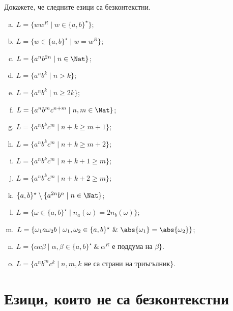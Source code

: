 \begin{problem}
  Докажете, че следните езици са безконтекстни.
  \begin{enumerate}[a)]
  \item
    $L = \{ww^R \mid w \in \{a,b\}^\star\}$;
  \item
    $L = \{w \in \{a,b\}^\star \mid w = w^R\}$;
  \item
    $L = \{a^nb^{2n} \mid n \in \Nat\}$;
  \item
    $L = \{a^nb^k \mid n > k\}$;
  \item
    $L = \{a^nb^k \mid n \geq 2k\}$;
  \item
    $L = \{a^nb^mc^{n+m}\mid n,m \in \Nat\}$;
  \item
    $L = \{a^nb^kc^m \mid n + k \geq m+1\}$;
  \item
    $L = \{a^nb^kc^m \mid n + k \geq m+2\}$;
  \item
    $L = \{a^nb^kc^m \mid n + k + 1 \geq m\}$;
  \item
    $L = \{a^nb^kc^m \mid n + k + 2 \geq m\}$;
  \item
    $\{a,b\}^\star \setminus \{a^{2n}b^n \mid n\in\Nat\}$;
  \item
    $L = \{\omega \in \{a,b\}^\star \mid n_a(\omega) = 2n_b(\omega)\}$;
  \item
    $L = \{\omega_1 a \omega_2 b \mid \omega_1,\omega_2 \in \{a,b\}^\star\ \&\ \abs{\omega_1} = \abs{\omega_2}\}$;
  \item
    $L = \{\alpha c \beta \mid \alpha,\beta \in \{a,b\}^\star\ \&\ \alpha^R\mbox{ е поддума на }\beta \}$.
  \item
    $L = \{a^nb^mc^k \mid n, m, k \text{ не са страни на триъгълник}\}$.
  \end{enumerate}
\end{problem}

\section{Езици, които не са безконтекстни}

